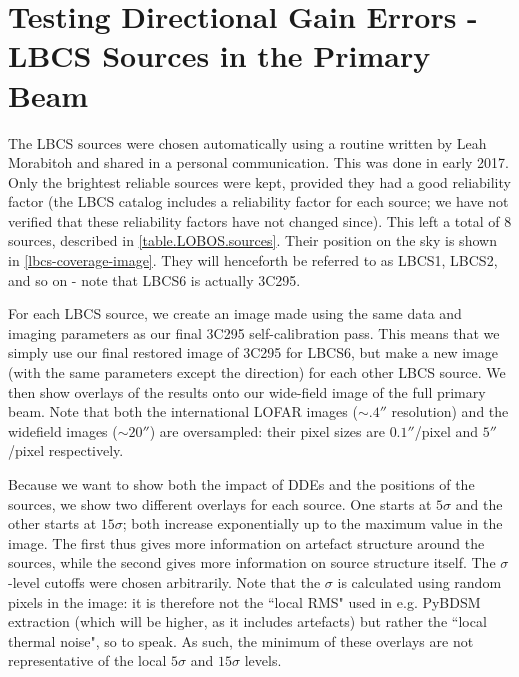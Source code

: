\section{Testing Directional Gain Errors - LBCS Sources in the Primary Beam}\label{section.decorr}

\pg
The LBCS sources were chosen automatically using a routine written by Leah Morabitoh and shared in a personal communication. This was done in early 2017. Only the brightest reliable sources were kept, provided they had a good reliability factor (the LBCS catalog includes a reliability factor for each source; we have not verified that these reliability factors have not changed since). This left a total of 8 sources, described in \cref{table.LOBOS.sources}. Their position on the sky is shown in \cref{lbcs-coverage-image}. They will henceforth be referred to as LBCS1, LBCS2, and so on - note that LBCS6 is actually 3C295.



\pg
For each LBCS source, we create an image made using the same data and imaging parameters as our final 3C295 self-calibration pass. This means that we simply use our final restored image of 3C295 for LBCS6, but make a new image (with the same parameters except the direction) for each other LBCS source. We then show overlays of the results onto our wide-field image of the full primary beam. Note that both the international LOFAR images ($\sim.4''$ resolution) and the widefield images ($\sim20''$) are oversampled: their pixel sizes are $0.1''$/pixel and $5''$/pixel respectively.

\pg
Because we want to show both the impact of DDEs and the positions of the sources, we show two different overlays for each source. One starts at $5\sigma$ and the other starts at $15\sigma$; both increase exponentially up to the maximum value in the image. The first thus gives more information on artefact structure around the sources, while the second gives more information on source structure itself. The $\sigma$-level cutoffs were chosen arbitrarily. Note that the $\sigma$ is calculated using random pixels in the image: it is therefore not the ``local RMS" used in e.g. PyBDSM extraction (which will be higher, as it includes artefacts) but rather the ``local thermal noise", so to speak. As such, the minimum of these overlays are not representative of the local $5\sigma$ and $15\sigma$ levels.

